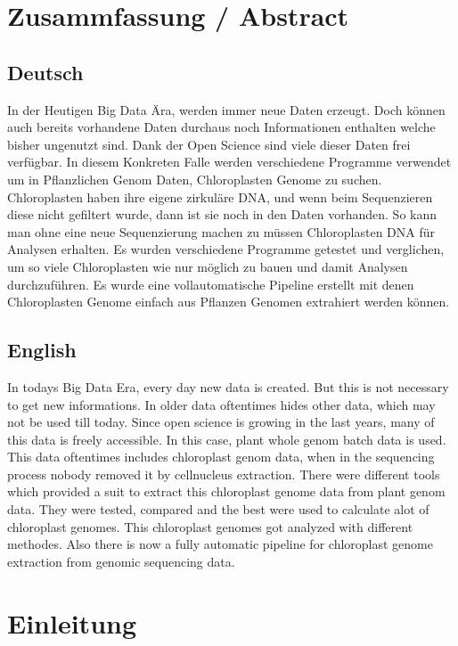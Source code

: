 \documentclass{scrartcl}
\begin{document}
\tableofcontents
\clearpage
\section{Zusammfassung / Abstract}
\label{sec-1}
\subsection{Deutsch}
\label{sec-1-1}
In der Heutigen Big Data Ära, werden immer neue Daten erzeugt. Doch können auch bereits vorhandene Daten durchaus noch Informationen enthalten welche bisher ungenutzt sind.
Dank der Open Science sind viele dieser Daten frei verfügbar. In diesem Konkreten Falle werden verschiedene Programme verwendet um in Pflanzlichen Genom Daten, Chloroplasten Genome zu 
suchen. Chloroplasten haben ihre eigene zirkuläre DNA, und wenn beim Sequenzieren diese nicht gefiltert wurde, dann ist sie noch in den Daten vorhanden. So kann man ohne 
eine neue Sequenzierung machen zu müssen Chloroplasten DNA für Analysen erhalten. Es wurden verschiedene Programme getestet und verglichen, um so viele Chloroplasten 
wie nur möglich zu bauen und damit Analysen durchzuführen. Es wurde eine vollautomatische Pipeline erstellt mit denen Chloroplasten Genome einfach aus Pflanzen Genomen
extrahiert werden können. 
\subsection{English}
\label{sec-1-2}
In todays Big Data Era, every day new data is created. But this is not necessary to get new informations. In older data oftentimes hides other data, which may not be used till today.
Since open science is growing in the last years, many of this data is freely accessible. In this case, plant whole genom batch data is used. This data oftentimes includes chloroplast
genom data, when in the sequencing process nobody removed it by cellnucleus extraction. There were different tools which provided a suit to extract this chloroplast genome data from plant
genom data. They were tested, compared and the best were used to calculate alot of chloroplast genomes. This chloroplast genomes got analyzed with different methodes. Also there is now
a fully automatic pipeline for chloroplast genome extraction from genomic sequencing data.

\section{Einleitung}
\label{sec-2}
\end{document}
